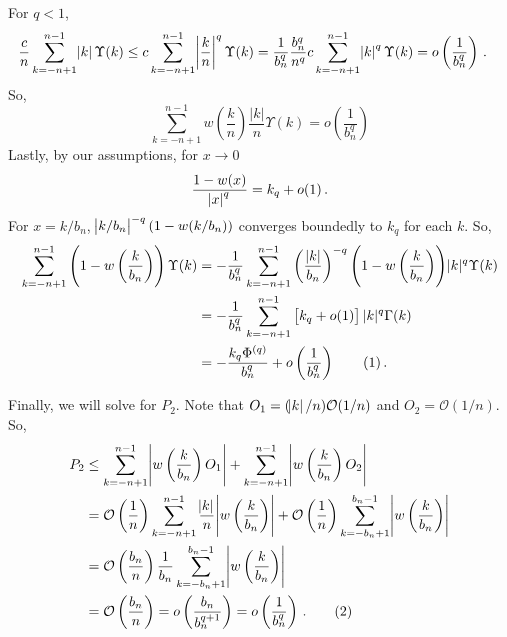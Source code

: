 \documentclass[11pt]{article}
\newcommand\numberthis{\addtocounter{equation}{1}\tag{\theequation}}
\theoremstyle{remark}
\begin{document}
For $q <1$,
\begin{align*}
   \dfrac{c}{n}\sum_{k = -n+1}^{n-1}\abs{k} \Upsilon(k)  &\leq c\sum_{k =-n+1}^{n-1}\abs{\dfrac{k}{n}}^q  \Upsilon(k)  = \dfrac{1}{b_n^q}\dfrac{b_n^q}{n^q} c \sum_{k =-n+1}^{n-1}\abs{k}^q \Upsilon(k)  = o\left(\dfrac{1}{b_n^q}\right) \, .
\end{align*}
So,
\begin{equation}
\label{eq:P1_second}
 \sum_{k = -n+1}^{n-1}w\left(\dfrac{k}{n}\right)\dfrac{|k|}{n}\Upsilon(k) = o \left(\dfrac{1}{b_n^q} \right)
\end{equation}
Lastly, by our assumptions, for $x \to 0$
\[
\dfrac{1 - w(x)}{\abs{x}^q} = k_q + o(1)\,.
\]
For $x = k/b_n$, $\abs{k/b_n}^{-q}(1-w(k/b_n))$ converges boundedly to $k_q$ for each $k$.
So,
\begin{align*}
     \sum_{k = -n+1}^{n-1}\left(1-w\left(\dfrac{k}{b_n}\right)\right)\Upsilon(k) &= -\dfrac{1}{b_n^q}\sum_{k = -n+1}^{n-1}  \left(\dfrac{|k|}{b_n}\right)^{-q} {\left(1-w\left(\dfrac{k}{b_n}\right)\right)}|k|^q \Upsilon(k) \\
     & = -\dfrac{1}{b_n^q}\sum_{k = -n+1}^{n-1}   \left[k_q + o(1) \right]|k|^q \Gamma(k) \\
     & = -\dfrac{k_q \Phi^{(q)} }{b_n^q} + o\left( \dfrac{1}{b_n^q} \right) \numberthis \label{eq:P1_third}\,.
\end{align*}

Finally, we will solve for $P_2$. Note that $O_1 = (\abs{k}/n)\mathcal{O}(1/n)$ and $O_2 = \mathcal{O}(1/n)$. So,
  \begin{align*}
    P_2  & \leq \sum_{k=-n+1}^{n-1}\abs{w\left(\dfrac{k}{b_n}\right)O_1} + \sum_{k=-n+1}^{n-1}\abs{w\left(\dfrac{k}{b_n}\right)O_2} \\
      &= \mathcal{O}\left(\dfrac{1}{n}\right)\sum_{k=-n+1}^{n-1}\dfrac{\abs{k}}{n}\abs{w\left(\dfrac{k}{b_n}\right)} + \mathcal{O}\left(\dfrac{1}{n}\right)\sum_{k=-b_n+1}^{b_n-1}\abs{w\left(\dfrac{k}{b_n}\right)}\\
      &= \mathcal{O}\left(\dfrac{b_n}{n}\right)\dfrac{1}{b_n} \sum_{k=-b_n+1}^{b_n-1}\abs{w\left(\dfrac{k}{b_n}\right)}\\
      &= \mathcal{O}\left(\dfrac{b_n}{n}\right) = o\left(\dfrac{b_n}{b_n^{q+1}}\right) = o\left(\dfrac{1}{b_n^{q}}\right) \,. \numberthis \label{eq:P_2}
 \end{align*}
 
\end{document}
